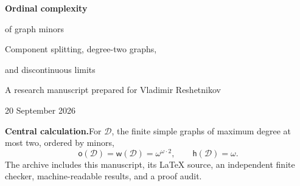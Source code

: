 \documentclass[11pt,letterpaper]{article}
\theoremstyle{plain}
\theoremstyle{definition}
\theoremstyle{remark}
\newcommand{\mot}{\mathsf o}
\newcommand{\wid}{\mathsf w}
\newcommand{\hei}{\mathsf h}
\newcommand{\DG}{\mathcal D}
\newcommand{\eps}{\varepsilon}
\begin{document}
\begin{titlepage}
\vspace*{0.65in}
\vspace{0.45in}
\begin{flushleft}
{\huge\bfseries Ordinal complexity\par of graph minors\par}
\vspace{0.2in}
{\Large Component splitting, degree-two graphs,\par and discontinuous limits\par}
\vspace{0.45in}
{\large A research manuscript prepared for Vladimir Reshetnikov}\par
\vspace{0.12in}
20 September 2026
\end{flushleft}
\vspace{0.4in}
\begin{abstract}
The ordinal invariants of the graph-minor ordering provide a concrete entry
point into an open program in well-partial-order theory. We study its
restriction to finite simple graphs of maximum degree two, and to related
classes with bounds on path size and the number of cyclic components. A
component-splitting argument, combined with the established maximal-order-type
theorem for finite multisets, proves that the finite disjoint-union closure of
a connected graph class of maximal order type $\alpha<\eps_0$ has maximal order
type $\omega^\alpha$. In particular, the degree-two graph-minor order has
maximal order type and ordinal width both equal to
$\omega^{\omega\cdot2}$, while its height is only $\omega$.
We give exact formulas throughout a two-parameter family, including
$\omega^{\omega+k}$ when at most $k$ cycles are allowed and path sizes are
unbounded. These formulas yield explicit failures of continuity under
increasing unions, even unions of minor-closed classes. An exact
cycle-allocation and path-packing criterion is proved and checked against
closure under elementary minor operations on all $1{,}500$ isomorphism classes
with at most fourteen vertices. The work is a partial attack on the general
graph-minor problem, not a calculation for all finite graphs; historical
novelty of the special-case formulas is not asserted.
\end{abstract}
\vfill
\begin{resultbox}
\textbf{Central calculation.}\quad For $\DG$, the finite simple graphs of
maximum degree at most two, ordered by minors,
\[
\boxed{\mot(\DG)=\wid(\DG)=\omega^{\omega\cdot2},\qquad \hei(\DG)=\omega.}
\]
The archive includes this manuscript, its \LaTeX{} source, an independent
finite checker, machine-readable results, and a proof audit.
\end{resultbox}
\end{titlepage}
\end{document}
